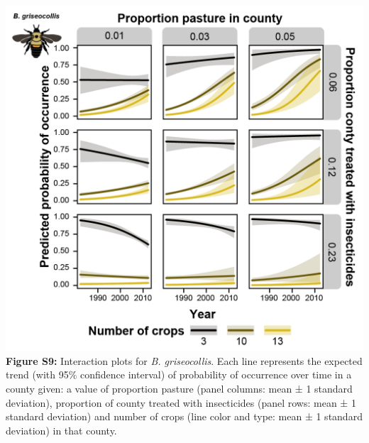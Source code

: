 \documentclass[11pt,]{article}
\begin{document}
\includegraphics[width=1\textwidth,height=\textheight]{../ms_figs/fig_s9.png}
\textbf{Figure S9:} Interaction plots for \emph{B. griseocollis}. Each
line represents the expected trend (with 95\% confidence interval) of
probability of occurrence over time in a county given: a value of
proportion pasture (panel columns: mean ± 1 standard deviation),
proportion of county treated with insecticides (panel rows: mean ± 1
standard deviation) and number of crops (line color and type: mean ± 1
standard deviation) in that county. \clearpage

\newpage
\end{document}
